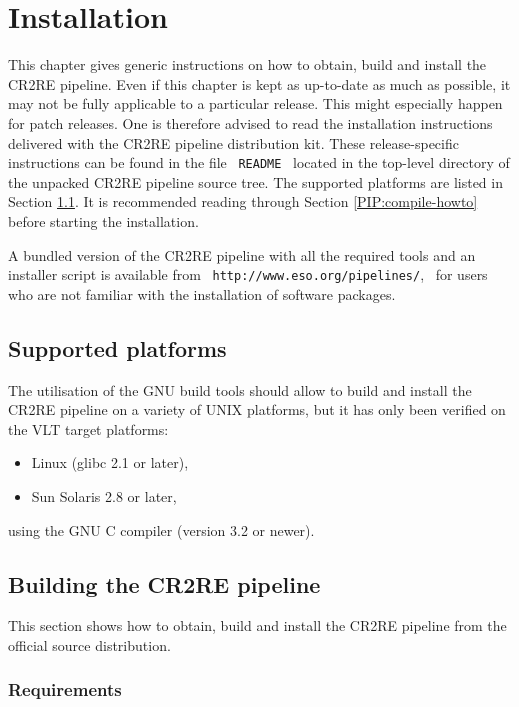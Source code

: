 \section{Installation}
\label{installation}

This chapter gives generic instructions on how to obtain, build and install
the CR2RE pipeline. Even if this chapter is kept as up-to-date as much as 
possible, it may not be fully applicable to a particular release. This might
especially happen for patch releases. One is therefore advised to read the 
installation instructions delivered with the CR2RE pipeline distribution kit.
These release-specific instructions can be found in the file \ \texttt{README}
\ located in the top-level directory of the unpacked CR2RE pipeline source 
tree. The supported platforms are listed in Section \ref{PIP:platforms}. 
It is recommended reading through Section \ref{PIP:compile-howto} 
before starting the installation.

A bundled version of the CR2RE pipeline with all the required tools 
and an installer script is available from 
\ \texttt{http://www.eso.org/pipelines/}, \ for users 
who are not familiar with the installation of software packages.


\subsection{Supported platforms}
\label{PIP:platforms}

The utilisation of the GNU build tools should allow to build and install
the CR2RE pipeline on a variety of UNIX platforms, but it has only been
verified on the VLT target platforms:
\begin{itemize}
  \item Linux (glibc 2.1 or later),
  \item Sun Solaris 2.8 or later,
\end{itemize}
using the GNU C compiler (version 3.2 or newer).


\subsection{Building the CR2RE pipeline}

This section shows how to obtain, build and install the CR2RE pipeline 
from the official source distribution.

\subsubsection{Requirements}
\label{PIP:requirements}

